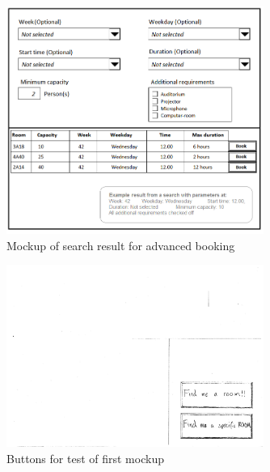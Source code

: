 \begin{figure}
\begin{center}
\leavevmode
\includegraphics[width=0.75\textwidth]{images/advanced_mockup}
\end{center}
\caption{Mockup of search result for advanced booking}
\label{fig:app1_mock1_5}
\end{figure}

\begin{figure}
\begin{center}
\leavevmode
\includegraphics[width=0.75\textwidth]{images/buttons1}
\end{center}
\caption{Buttons for test of first mockup}
\label{fig:app1_mock1_6}
\end{figure}

